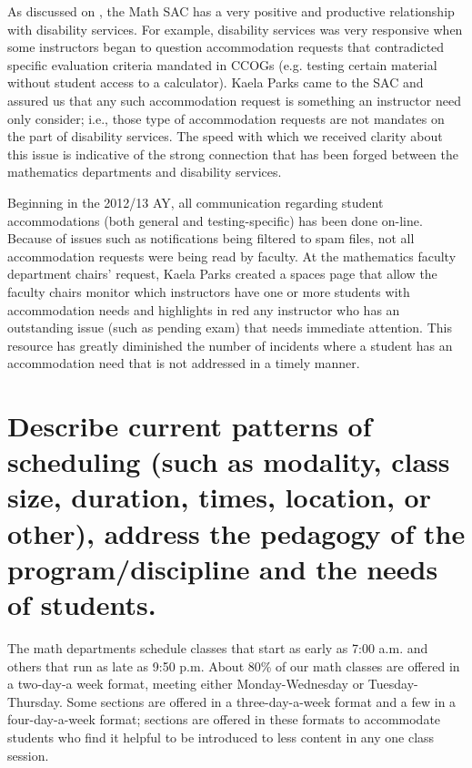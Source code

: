 
As discussed on ,
the Math SAC has a very positive and productive relationship with disability
services.  For example, disability services was very responsive when some
instructors began to question accommodation requests that contradicted specific
evaluation criteria mandated in CCOGs (e.g. testing certain material without
student access to a calculator).  Kaela Parks came to the SAC and assured us
that any such accommodation request is something an instructor need only
consider; i.e., those type of accommodation requests are not mandates on the
part of disability services.  The speed with which we received clarity about
this issue is indicative of the strong connection that has been forged between
the mathematics departments and disability services.

Beginning in the 2012/13 AY, all communication regarding student accommodations
(both general and testing-specific) has been done on-line.
Because of issues such as notifications being filtered to spam files, not all
accommodation requests were being read by faculty.  At the  mathematics faculty
department chairs' request, Kaela Parks created a spaces page that allow the
faculty chairs monitor which instructors have one or more students with
accommodation needs and highlights in red any instructor who has an outstanding
issue (such as pending exam) that needs immediate attention.  This resource has
greatly diminished the number of incidents where a student has an
accommodation need that is not addressed in a timely manner.

\section{Describe current patterns of scheduling (such as modality, class size, duration, times, location, or other),  address the pedagogy of the program/discipline and the needs of students.} 
\label{facilities:sec:scheduling}
The math departments schedule classes that start as early as 7:00 a.m. and
others that run as late as 9:50 p.m.  About 80\% of our math classes are offered
in a two-day-a week format, meeting either Monday-Wednesday or
Tuesday-Thursday.  Some sections are offered in a three-day-a-week format and a
few in a four-day-a-week format; sections are offered in these formats to
accommodate students who find it helpful to be introduced to less content in
any one class session.  

